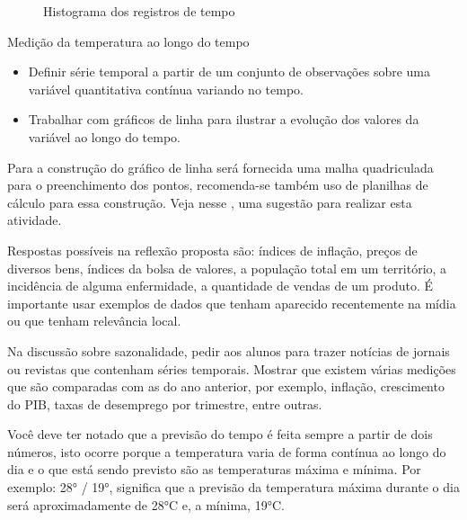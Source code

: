 \begin{figure}[H]
\centering
\capstart

\noindent{}
\caption{Histograma dos registros de tempo}\label{\detokenize{PE103-3:fig-histograma-resposta}}\label{\detokenize{PE103-3:id3}}\end{figure}
\label{\detokenize{PE103-3:ativ-medicao-temperatura-serie-temporal}}
\begin{task}{ Medição da temperatura ao longo do tempo}

\begin{itemize}
\item {} 
Definir série temporal a partir de um conjunto de observações sobre uma variável quantitativa contínua variando no tempo.

\item {} 
Trabalhar com  gráficos de linha para ilustrar a evolução dos valores da variável ao longo do tempo.

\end{itemize}


Para a construção do gráfico de linha será fornecida uma malha quadriculada para o preenchimento dos pontos, recomenda-se também uso de planilhas de cálculo para essa construção. Veja nesse , uma sugestão para realizar esta atividade.

Respostas possíveis na reflexão proposta são: índices de inflação, preços de diversos bens,  índices da bolsa de valores, a população total em um território, a incidência de alguma enfermidade, a quantidade de vendas de um produto. É importante usar exemplos de dados que tenham aparecido recentemente na mídia ou que tenham relevância local.

Na discussão sobre sazonalidade, pedir aos alunos para trazer notícias de jornais ou revistas que contenham séries temporais. Mostrar que existem várias medições que são comparadas com as do ano anterior, por exemplo, inflação, crescimento do PIB, taxas de desemprego por trimestre, entre outras.

Você deve ter notado que a previsão do tempo é feita sempre a partir de dois números, isto ocorre porque a temperatura varia de forma contínua ao longo do dia e o que está sendo previsto são as temperaturas máxima e mínima. Por exemplo: 28° / 19°, significa que a previsão da temperatura máxima durante o dia será aproximadamente de 28°C e, a mínima, 19°C.


\end{task}
